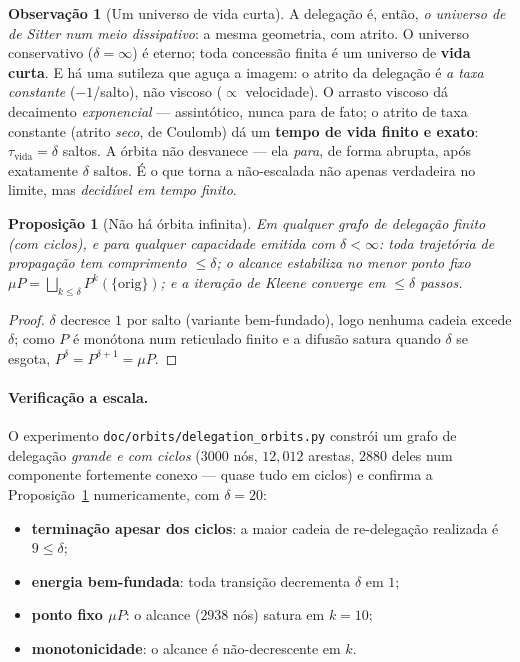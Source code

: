 \documentclass[11pt,a4paper]{article}
\newtheorem{proposition}[theorem]{Proposição}
\theoremstyle{definition}
\newtheorem{remark}[theorem]{Observação}
\newcommand{\dep}{\delta}
\begin{document}
  \begin{remark}[Um universo de vida curta]\label{rem:vida}
  A delegação é, então, \emph{o universo de de Sitter num meio dissipativo}: a
  mesma geometria, com atrito. O universo conservativo ($\dep=\infty$) é eterno;
  toda concessão finita é um universo de \textbf{vida curta}. E há uma sutileza
  que aguça a imagem: o atrito da delegação é \emph{a taxa constante}
  ($-1$/salto), não viscoso ($\propto$ velocidade). O arrasto viscoso dá decaimento
  \emph{exponencial} --- assintótico, nunca para de fato; o atrito de taxa
  constante (atrito \emph{seco}, de Coulomb) dá um \textbf{tempo de vida finito e
  exato}: $\tau_{\mathrm{vida}}=\dep$ saltos. A órbita não desvanece --- ela
  \emph{para}, de forma abrupta, após exatamente $\dep$ saltos. É o que torna a
  não-escalada não apenas verdadeira no limite, mas \emph{decidível em tempo
  finito}.
  \end{remark}

  \begin{proposition}[Não há órbita infinita]\label{prop:orbit}
  Em qualquer grafo de delegação \emph{finito} (com ciclos), e para qualquer
  capacidade emitida com $\dep<\infty$: toda trajetória de propagação tem
  comprimento $\le\dep$; o alcance estabiliza no menor ponto fixo
  $\mu P=\bigsqcup_{k\le\dep}P^k(\{\mathrm{orig}\})$; e a iteração de Kleene
  converge em $\le\dep$ passos.
  \end{proposition}
  \begin{proof}
  $\dep$ decresce $1$ por salto (variante bem-fundado), logo nenhuma cadeia
  excede $\dep$; como $P$ é monótona num reticulado finito e a difusão satura
  quando $\dep$ se esgota, $P^{\dep}=P^{\dep+1}=\mu P$.
  \end{proof}

  \paragraph{Verificação a escala.} O experimento
  \texttt{doc/orbits/delegation\_orbits.py} constrói um grafo de delegação
  \emph{grande e com ciclos} ($3000$ nós, $12{,}012$ arestas, $2880$ deles num
  componente fortemente conexo --- quase tudo em ciclos) e confirma a
  Proposição~\ref{prop:orbit} numericamente, com $\dep=20$:
  \begin{itemize}[nosep,leftmargin=1.3em]
    \item \textbf{terminação apesar dos ciclos}: a maior cadeia de re-delegação
          realizada é $9\le\dep$;
    \item \textbf{energia bem-fundada}: toda transição decrementa $\dep$ em $1$;
    \item \textbf{ponto fixo $\mu P$}: o alcance ($2938$ nós) satura em $k=10$;
    \item \textbf{monotonicidade}: o alcance é não-decrescente em $k$.
  \end{itemize}
\end{document}
